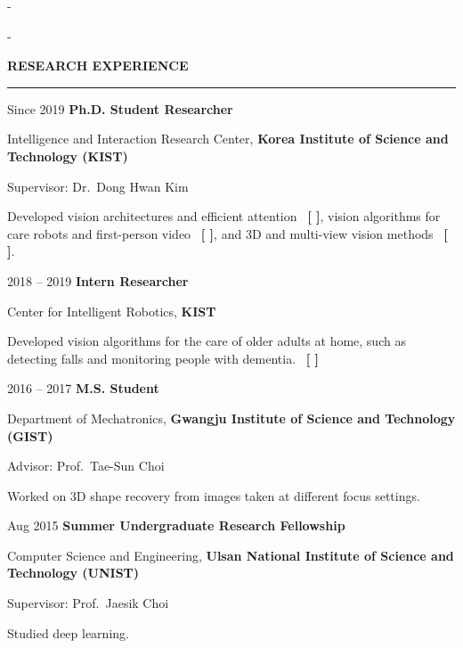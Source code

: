 \documentclass[11pt,a4paper]{article}
\makeatletter
\newcommand{\keepspace}[1]{\par\penalty\z@\begingroup\setlength{\dimen@}{#1}%
  \dimen@ii\pagegoal\advance\dimen@ii-\pagetotal
  \ifdim\dimen@>\dimen@ii\ifdim\dimen@ii>\z@\vfill\fi\break\fi\endgroup}
\newcommand{\cvsection}[2][8]{\par\vspace{8pt}\keepspace{#1\baselineskip}%
  {\color{cvblue}\large\bfseries\MakeUppercase{#2}\par}\vspace{3pt}%
  {\color{cvblue}\hrule height 1pt}\vspace{8pt}}
\newlength{\datecol}\setlength{\datecol}{0.95in}
\newlength{\dategap}\setlength{\dategap}{0.16in}
\newenvironment{entries}{\begin{description}[leftmargin=\dimexpr\datecol+\dategap\relax,
    labelwidth=\datecol, labelsep=\dategap, align=right, font=\normalfont,
    itemsep=7pt, topsep=0pt, parsep=0pt, partopsep=0pt, before=\raggedright]}{\end{description}}
\newcommand{\rt}[1]{\unskip~{\color{cvblue}\scriptsize\bfseries[%
  \def\rt@sep{\def\rt@sep{,~}}%
  \renewcommand*{\do}[1]{\rt@sep\hyperlink{pub:##1}{##1}}\docsvlist{#1}]}}
\makeatother
\begin{document}
\keepspace{9\baselineskip}
\cvsection{Research Experience}
\begin{entries}
  \item[Since 2019] \textbf{Ph.D. Student Researcher}\par
    Intelligence and Interaction Research Center,
    \textbf{Korea Institute of Science and Technology (KIST)}\par
    Supervisor: Dr.\ Dong Hwan Kim\par
    Developed vision architectures and efficient attention \rt{1, 4, 11}, vision algorithms for care
    robots and first-person video \rt{2, 3, 5, 6}, and 3D and multi-view vision methods \rt{7, 10}.
  \item[2018 -- 2019] \textbf{Intern Researcher}\par
    Center for Intelligent Robotics, \textbf{KIST}\par
    Developed vision algorithms for the care of older adults at home, such as detecting falls and monitoring people with dementia.
    \rt{8, 9}
  \item[2016 -- 2017] \textbf{M.S. Student}\par
    Department of Mechatronics, \textbf{Gwangju Institute of Science and Technology (GIST)}\par
    Advisor: Prof.\ Tae-Sun Choi\par
    Worked on 3D shape recovery from images taken at different focus settings.
  \item[Aug 2015] \textbf{Summer Undergraduate Research Fellowship}\par
    Computer Science and Engineering,
    \textbf{Ulsan National Institute of Science and Technology (UNIST)}\par
    Supervisor: Prof.\ Jaesik Choi\par
    Studied deep learning.
\end{entries}
\end{document}
